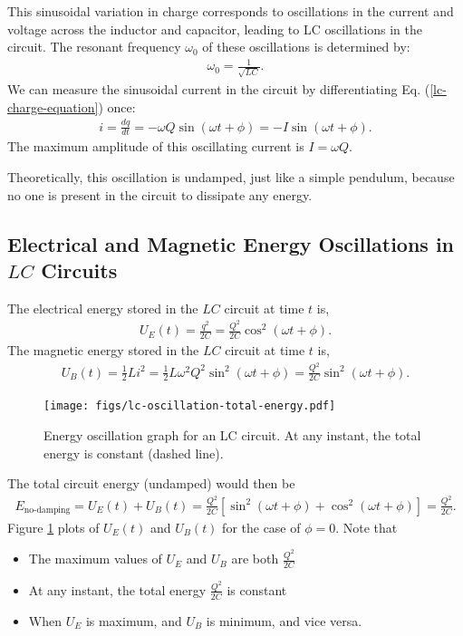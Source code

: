 \documentclass[12pt,b4paper]{article}
\begin{document}
This sinusoidal variation in charge corresponds to oscillations in the current and voltage across the inductor and capacitor, leading to LC oscillations in the circuit. The resonant frequency $\omega_0$ of these oscillations is determined by:
\begin{align}
    \omega_0=\frac{1}{\sqrt{LC}}.
\end{align}
We can measure the sinusoidal current in the circuit by differentiating Eq. (\ref{lc-charge-equation}) once:
\begin{align}
    i=\frac{dq}{dt}=-\omega Q\sin{(\omega t+\phi)}=-I\sin{(\omega t+\phi)}.
\end{align}
The maximum amplitude of this oscillating current is $I=\omega Q$.

Theoretically, this oscillation is undamped, just like a simple pendulum, because no one is present in the circuit to dissipate any energy.
\subsection{Electrical and Magnetic Energy Oscillations in $LC$ Circuits}
The electrical energy stored in the $LC$ circuit at time $t$ is,
\begin{align}
    U_E(t)=\frac{q^2}{2C}=\frac{Q^2}{2C}\cos^2{(\omega t+\phi)}.
\end{align}
The magnetic energy stored in the $LC$ circuit at time $t$ is,
\begin{align}
    U_B(t)=\frac{1}{2}Li^2=\frac{1}{2}L\omega^2Q^2\sin^2{(\omega t+\phi)}=\frac{Q^2}{2C}\sin^2{(\omega t+\phi)}.
\end{align}
\begin{figure}[H]
    \centering
    \texttt{[image: figs/lc-oscillation-total-energy.pdf]}
    \caption{Energy oscillation graph for an LC circuit. At any instant, the total energy is constant (dashed line).}
    \label{fig:lc-circuit-undamped-energy}
\end{figure}
The total circuit energy (undamped) would then be
\begin{align}
    E_\text{no-damping}=U_E(t)+U_B(t)=\frac{Q^2}{2C}\left[\sin^2{(\omega t+\phi)}+\cos^2{(\omega t+\phi)}\right]=\frac{Q^2}{2C}.
\end{align}
Figure \ref{fig:lc-circuit-undamped-energy} plots of $U_E(t)$ and $U_B(t)$ for the case of $\phi=0$. Note that
\begin{itemize}
\setlength{\itemsep}{0pt}
    \item The maximum values of $U_E$ and $U_B$ are both $\displaystyle\frac{Q^2}{2C}$
    \item At any instant, the total energy $\displaystyle\frac{Q^2}{2C}$ is constant
    \item When $U_E$ is maximum, and $U_B$ is minimum, and vice versa.
\end{itemize}
\end{document}

